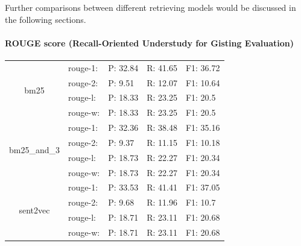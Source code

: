 Further comparisons between different retrieving models would be discussed in the following sections.

\paragraph{ROUGE score (Recall-Oriented Understudy for Gisting Evaluation) }

\begin{table}[htbp]
	\centering
	\begin{tabular}{crrrr}
		\toprule
		\multirow{4}[2]{*}{bm25} & \multicolumn{1}{l}{rouge-1:} & \multicolumn{1}{l}{P: 32.84} & \multicolumn{1}{l}{R: 41.65} & \multicolumn{1}{l}{F1: 36.72} \\
		& \multicolumn{1}{l}{rouge-2:} & \multicolumn{1}{l}{P: 9.51} & \multicolumn{1}{l}{R: 12.07} & \multicolumn{1}{l}{F1: 10.64} \\
		& \multicolumn{1}{l}{rouge-l:} & \multicolumn{1}{l}{P: 18.33} & \multicolumn{1}{l}{R: 23.25} & \multicolumn{1}{l}{F1: 20.5} \\
		& \multicolumn{1}{l}{rouge-w:} & \multicolumn{1}{l}{P: 18.33} & \multicolumn{1}{l}{R: 23.25} & \multicolumn{1}{l}{F1: 20.5} \\
		\midrule
		\multirow{4}[2]{*}{bm25\_and\_3} & \multicolumn{1}{l}{rouge-1:} & \multicolumn{1}{l}{P: 32.36} & \multicolumn{1}{l}{R: 38.48} & \multicolumn{1}{l}{F1: 35.16} \\
		& \multicolumn{1}{l}{rouge-2:} & \multicolumn{1}{l}{P: 9.37} & \multicolumn{1}{l}{R: 11.15} & \multicolumn{1}{l}{F1: 10.18} \\
		& \multicolumn{1}{l}{rouge-l:} & \multicolumn{1}{l}{P: 18.73} & \multicolumn{1}{l}{R: 22.27} & \multicolumn{1}{l}{F1: 20.34} \\
		& \multicolumn{1}{l}{rouge-w:} & \multicolumn{1}{l}{P: 18.73} & \multicolumn{1}{l}{R: 22.27} & \multicolumn{1}{l}{F1: 20.34} \\
		\midrule
		\multirow{4}[2]{*}{sent2vec} & \multicolumn{1}{l}{rouge-1:} & \multicolumn{1}{l}{P: 33.53} & \multicolumn{1}{l}{R: 41.41} & \multicolumn{1}{l}{F1: 37.05} \\
		& \multicolumn{1}{l}{rouge-2:} & \multicolumn{1}{l}{P: 9.68} & \multicolumn{1}{l}{R: 11.96} & \multicolumn{1}{l}{F1: 10.7} \\
		& \multicolumn{1}{l}{rouge-l:} & \multicolumn{1}{l}{P: 18.71} & \multicolumn{1}{l}{R: 23.11} & \multicolumn{1}{l}{F1: 20.68} \\
		& \multicolumn{1}{l}{rouge-w:} & \multicolumn{1}{l}{P: 18.71} & \multicolumn{1}{l}{R: 23.11} & \multicolumn{1}{l}{F1: 20.68} \\

\end{tabular}
\end{table}
